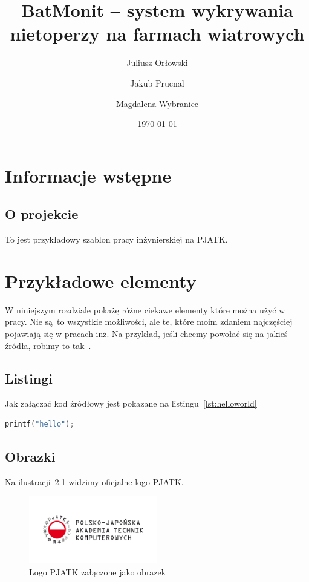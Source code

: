 \documentclass{sprz}
\title{BatMonit -- system wykrywania nietoperzy na farmach wiatrowych}
\author{Juliusz Orłowski}{s19799}{Aplikacje Internetowe}{Niestacjonarny}
\author{Jakub Prucnal}{s19800}{Sztuczna Inteligencja}{Niestacjonarny}
\author{Magdalena Wybraniec}{s19798}{Sztuczna Inteligencja}{Niestacjonarny}
\date{\today}
\begin{document}
\maketitle

\makeprojectcard
\makedeclaration

\tableofcontents

\chapter{Informacje wstępne}



\section{O projekcie}\label{ch:wstep}

To jest przykładowy szablon pracy inżynierskiej na PJATK.

\chapter{Przykładowe elementy}

W niniejszym rozdziale pokażę różne ciekawe elementy które można użyć w pracy. Nie są to wszystkie możliwości, ale te, które moim zdaniem najczęściej pojawiają się w pracach inż. Na przykład, jeśli chcemy powołać się na jakieś źródła, robimy to tak~\cite{BEHESHTIROUI2021107419}.

\section{Listingi}

Jak załączać kod źródłowy jest pokazane na listingu~\ref{lst:helloworld}


\begin{lstlisting}[language=c,caption={Przykładowy witaj w świecie}, label={lst:helloworld}]
printf("hello");
\end{lstlisting}

\section{Obrazki}

Na ilustracji~\ref{img:pjatklogo} widzimy oficjalne logo PJATK.

\begin{figure}[h]
    \centering
    \includegraphics[width=0.5\textwidth]{sprz/pjatk}
    \caption{Logo PJATK załączone jako obrazek}
    \label{img:pjatklogo}
\end{figure}
\end{document}
